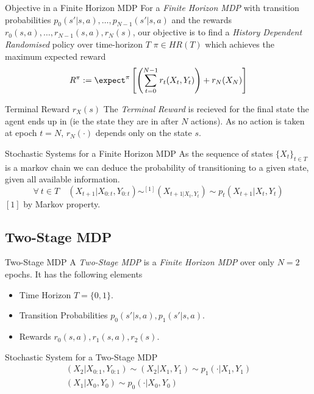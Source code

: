 \documentclass[11pt,a4paper]{article}
\begin{document}
  \begin{proposition}{Objective in a Finite Horizon MDP}
    For a \textit{Finite Horizon MDP} with transition probabilities $p_0(s'|s,a),\dots,p_{N-1}(s'|s,a)$ and the rewards $r_0(s,a),\dots,r_{N-1}(s,a),r_N(s)$, our objective is to find a \textit{History Dependent Randomised} policy over time-horizon $T$ $\pi\in HR(T)$ which achieves the maximum expected reward
    \[ R^\pi:=\expect^\pi\left[\left(\sum_{t=0}^{N-1}r_t(X_t,Y_t)\right)+r_N(X_N)\right] \]
  \end{proposition}

  \begin{definition}{Terminal Reward $r_X(s)$}
    The \textit{Terminal Reward} is recieved for the final state the agent ends up in (ie the state they are in after $N$ actions). As no action is taken at epoch $t=N$, $r_N(\cdot)$ depends only on the state $s$.
  \end{definition}

  \begin{proposition}{Stochastic Systems for a Finite Horizon MDP}
    As the sequence of states $\{X_t\}_{t\in T}$ is a markov chain we can deduce the probability of transitioning to a given state, given all available information.
    \[ \forall\ t\in T\quad (X_{t+1}|X_{0:t},Y_{0:t})\sim^{[1]}(X_{t+1|X_t,Y_t})\sim p_t(X_{t+1}|X_t,Y_t) \]
    $[1]$ by Markov property.
  \end{proposition}

\subsection*{Two-Stage MDP}

  \begin{definition}{Two-Stage MDP}
    A \textit{Two-Stage MDP} is a \textit{Finite Horizon MDP} over only $N=2$ epochs. It has the following elements
    \begin{itemize}
      \item Time Horizon $T=\{0,1\}$.
      \item Transition Probabilities $p_0(s'|s,a),p_1(s'|s,a)$.
      \item Rewards $r_0(s,a),r_1(s,a),r_2(s)$.
    \end{itemize}
  \end{definition}

  \begin{proposition}{Stochastic System for a Two-Stage MDP}
    \[\begin{array}{l}
      (X_2|X_{0:1},Y_{0:1})\sim(X_2|X_1,Y_1)\sim p_1(\cdot|X_1,Y_1)\\
      (X_1|X_0,Y_0)\sim p_0(\cdot|X_0,Y_0)
    \end{array}\]
  \end{proposition}
\end{document}
